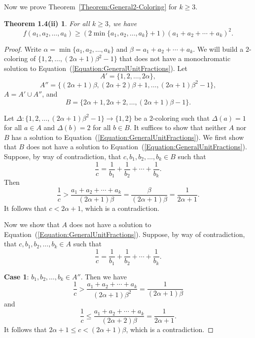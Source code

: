\documentclass[10pt,a4paper]{amsart}
\newtheorem*{thm1.4PartII}{Theorem 1.4(ii)}
\begin{document}
Now we prove Theorem~\ref{Theorem:General2-Coloring} for $k\geq3$.
\begin{thm1.4PartII}\label{Theorem:General2-Coloring_k=3}
For all $k\geq3$, we have
    \[
    f(a_1,a_2,\ldots,a_k)\geq(2\min\{a_1,a_2,\ldots,a_k\}+1)(a_1+a_2+\cdots+a_k)^2.
    \]    
\end{thm1.4PartII}

\begin{proof}
    Write $\alpha=\min\{a_1,a_2,\ldots,a_k\}$ and $\beta=a_1+a_2+\cdots+a_k$. We will build a $2$-coloring of $\{1,2,\ldots,(2\alpha+1)\beta^2-1\}$ that does not have a monochromatic solution to Equation~(\ref{Equation:GeneralUnitFractions}). Let \[A'=\{1,2,\ldots,2\alpha\},\]
    \[
    A''=\{(2\alpha+1)\beta,(2\alpha+2)\beta+1,\ldots,(2\alpha+1)\beta^2-1\},
    \]
    $A=A'\cup A''$, and
    \[
    B=\{2\alpha+1,2\alpha+2,\ldots,(2\alpha+1)\beta-1\}.
    \]
    
    Let $\Delta:\{1,2,\ldots,(2\alpha+1)\beta^2-1\}\to\{1,2\}$ be a $2$-coloring such that $\Delta(a)=1$ for all $a\in A$ and $\Delta(b)=2$ for all $b\in B$. It suffices to show that neither $A$ nor $B$ has a solution to Equation~(\ref{Equation:GeneralUnitFractions}). We first show that $B$ does not have a solution to Equation~(\ref{Equation:GeneralUnitFractions}). Suppose, by way of contradiction, that $c,b_1,b_2,\ldots,b_k\in B$ such that
    \[
    \frac{1}{c}=\frac{1}{b_1}+\frac{1}{b_2}+\cdots+\frac{1}{b_k}.
    \]
    Then
    \[
    \frac{1}{c}>\frac{a_1+a_2+\cdots+a_k}{(2\alpha+1)\beta}=\frac{\beta}{(2\alpha+1)\beta}=\frac{1}{2\alpha+1}.
    \]
    It follows that $c<2\alpha+1$, which is a contradiction. 

    Now we show that $A$ does not have a solution to Equation~(\ref{Equation:GeneralUnitFractions}). Suppose, by way of contradiction, that $c,b_1,b_2,\ldots,b_k\in A$ such that
    \[
    \frac{1}{c}=\frac{1}{b_1}+\frac{1}{b_2}+\cdots+\frac{1}{b_k}.
    \]

{\bf Case 1}: $b_1,b_2,\ldots,b_k\in A''$. Then we have
    \[
    \frac{1}{c}>\frac{a_1+a_2+\cdots+a_k}{(2\alpha+1)\beta^2}=\frac{1}{(2\alpha+1)\beta}
    \]
    and
    \[
    \frac{1}{c}\leq\frac{a_1+a_2+\cdots+a_k}{(2\alpha+2)\beta}=\frac{1}{2\alpha+1}.
    \]
    It follows that $2\alpha+1\leq c<(2\alpha+1)\beta$, which is a contradiction.


\end{proof}
\end{document}
